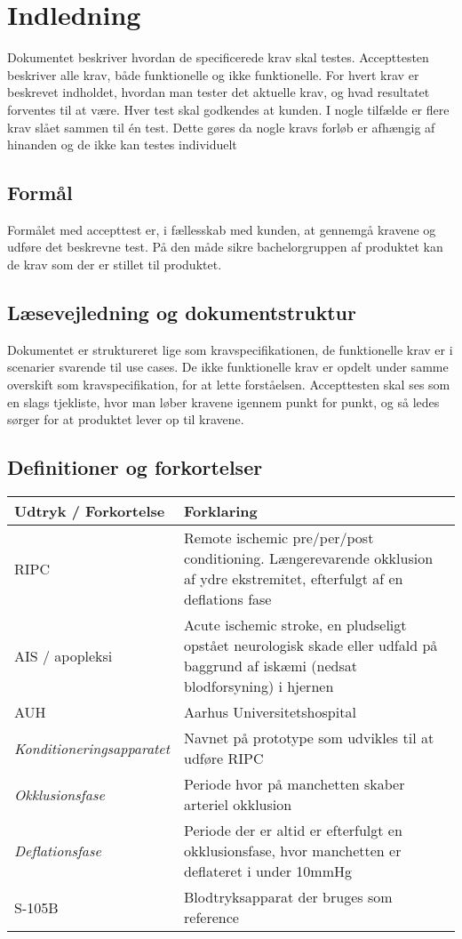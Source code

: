 	\chapter{Indledning}
	Dokumentet beskriver hvordan de specificerede krav skal testes. Accepttesten beskriver alle krav, både funktionelle og ikke funktionelle. For hvert krav er beskrevet indholdet, hvordan man tester det aktuelle krav, og hvad resultatet forventes til at være. Hver test skal godkendes at kunden. 
	I nogle tilfælde er flere krav slået sammen til én test. Dette gøres da nogle kravs forløb er afhængig af hinanden og de ikke kan testes individuelt 
	
	\section{Formål}
	Formålet med accepttest er, i fællesskab med kunden, at gennemgå kravene og udføre det beskrevne test. På den måde sikre bachelorgruppen af produktet kan de krav som der er stillet til produktet. 
	
	\section{Læsevejledning og dokumentstruktur}
	Dokumentet er struktureret lige som kravspecifikationen, de funktionelle krav er i scenarier svarende til use cases. De ikke funktionelle krav er opdelt under samme overskift som kravspecifikation, for at lette forståelsen. 
	Accepttesten skal ses som en slags tjekliste, hvor man løber kravene igennem punkt for punkt, og så ledes sørger for at produktet lever op til kravene. 
	
	\pagebreak
	\section{Definitioner og forkortelser}
	\begin{longtable}{ |p{} |p{}| } 
		\hline
		\rowcolor{usDef}
		\textbf{Udtryk / Forkortelse} &  \textbf{Forklaring} \\
		\hline
		RIPC & Remote ischemic pre/per/post conditioning. Længerevarende okklusion af ydre ekstremitet, efterfulgt af en deflations fase\\
		\hline
		AIS / apopleksi & Acute ischemic stroke, en pludseligt opstået neurologisk skade eller udfald på baggrund af iskæmi (nedsat blodforsyning) i hjernen \\
		\hline
		AUH & Aarhus Universitetshospital \\
		\hline
		\textit{Konditioneringsapparatet} & Navnet på prototype som udvikles til at udføre RIPC \\
		\hline
		\textit{Okklusionsfase} & Periode hvor på manchetten skaber arteriel okklusion \\
		\hline
		\textit{Deflationsfase} & Periode der er altid er efterfulgt en okklusionsfase, hvor manchetten er deflateret i under 10mmHg\\
		\hline
		S-105B & Blodtryksapparat der bruges som reference \\
		\hline
	\end{longtable}